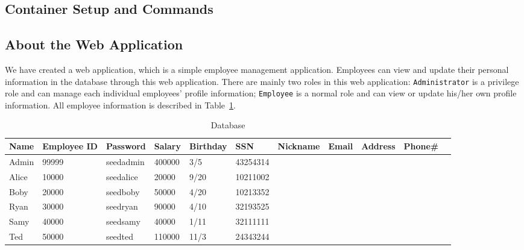 \subsection{Container Setup and Commands}








\subsection{About the Web Application} 

We have created a web application, which is a simple employee 
management application. 
Employees can view and update their personal information 
in the database through this web application. 
There are mainly two roles in this web application: 
{\tt Administrator} is a privilege role and can manage each individual
employees' profile information;
{\tt Employee} is a normal role and can view or update his/her own profile 
information. All employee information is described in Table~\ref{table:database}.


\begin{table}[htb]
\caption{Database}
\label{table:database}
\centering
\begin{adjustbox}{max width=\textwidth}
\begin{tabular}{|l|l|l|l|l|l|l|l|l|l|l|}
\hline
Name & Employee ID  & Password  &Salary  &Birthday  &SSN &Nickname &Email &Address &Phone\# \\
\hline
Admin 	& 99999       & seedadmin  &400000  &3/5   &43254314	& & & &\\
Alice 	& 10000       & seedalice  &20000   &9/20  &10211002	& & & &\\
Boby 	& 20000       & seedboby   &50000   &4/20  &10213352	& & & &\\
Ryan    & 30000       & seedryan   &90000   &4/10  &32193525	& & & &\\
Samy 	& 40000	      & seedsamy   &40000   &1/11  &32111111 	& & & &\\
Ted     & 50000	      & seedted    &110000  &11/3  &24343244	& & & &\\
\hline
\end{tabular}
\end{adjustbox}
\end{table}
 



